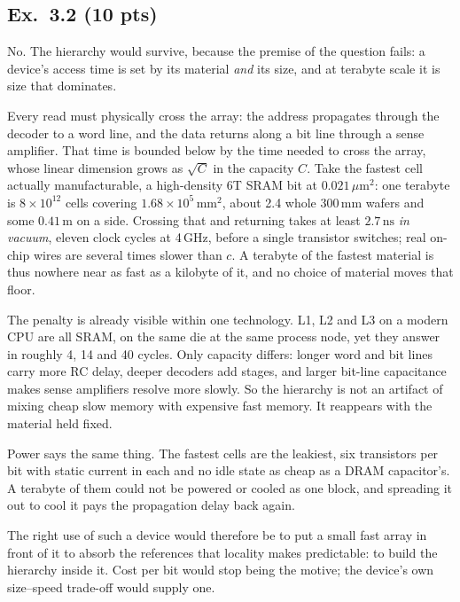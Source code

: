 \subsection*{Ex.~3.2 (10 pts)}

No. The hierarchy would survive, because the premise of the question fails: a
device's access time is set by its material \emph{and} its size, and at terabyte
scale it is size that dominates.

Every read must physically cross the array: the address propagates through the
decoder to a word line, and the data returns along a bit line through a sense
amplifier. That time is bounded below by the time needed to cross the array, whose
linear dimension grows as $\sqrt{C}$ in the capacity $C$. Take the fastest cell
actually manufacturable, a high-density 6T SRAM bit at $0.021\,\mu\mathrm{m}^2$: one
terabyte is $8\times10^{12}$ cells covering $1.68\times10^{5}\,\mathrm{mm}^2$, about
2.4 whole 300\,mm wafers and some $0.41\,\mathrm{m}$ on a side. Crossing that and
returning takes at least $2.7\,\mathrm{ns}$ \emph{in vacuum}, eleven clock cycles at
4\,GHz, before a single transistor switches; real on-chip wires are several times
slower than $c$. A terabyte of the fastest material is thus nowhere near as fast as
a kilobyte of it, and no choice of material moves that floor.

The penalty is already visible within one technology. L1, L2 and L3 on a modern CPU
are all SRAM, on the same die at the same process node, yet they answer in roughly
4, 14 and 40 cycles. Only capacity differs: longer word and bit lines carry more RC
delay, deeper decoders add stages, and larger bit-line capacitance makes sense
amplifiers resolve more slowly. So the hierarchy is not an artifact of mixing cheap
slow memory with expensive fast memory. It reappears with the material held fixed.

Power says the same thing. The fastest cells are the leakiest, six transistors per
bit with static current in each and no idle state as cheap as a DRAM capacitor's. A
terabyte of them could not be powered or cooled as one block, and spreading it out
to cool it pays the propagation delay back again.

The right use of such a device would therefore be to put a small fast array in front
of it to absorb the references that locality makes predictable: to build the
hierarchy inside it. Cost per bit would stop being the motive; the device's own
size--speed trade-off would supply one.
